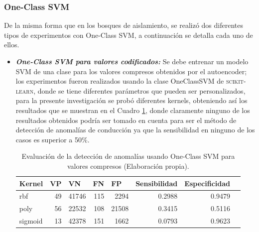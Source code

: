\subsubsection{One-Class SVM}

De la misma forma que en los bosques de aislamiento, se realiz\'{o} dos diferentes tipos de experimentos con One-Class SVM, a continuaci\'{o}n se detalla cada uno de ellos.

\begin{itemize}
\item \textbf{\textit{One-Class SVM para valores codificados: }}Se debe entrenar un modelo SVM de una clase para los valores compresos obtenidos por el autoencoder; los experimentos fueron realizados usando la clase OneClassSVM de \textsc{scikit-learn}, donde se tiene diferentes par\'{a}metros que pueden ser personalizados, para la presente investigaci\'{o}n se prob\'{o} diferentes kernels, obteniendo as\'{i} los resultados que se muestran en el Cuadro \ref{table:evaluacion_SVM_encoded}, donde claramente ninguno de los resultados obtenidos podr\'{i}a ser tomado en cuenta para ser el m\'{e}todo de detecci\'{o}n de anomal\'{i}as de conducci\'{o}n ya que la sensibilidad en ninguno de los casos es superior a 50\%.

\begin{table}[H]
\centering
\begin{center}
\begin{tabular}{|l|r|r|r|r|r|r|r|}
\hline
\textbf{Kernel} & \multicolumn{1}{l|}{\textbf{VP}} & \multicolumn{1}{l|}{\textbf{VN}}& \multicolumn{1}{l|}{\textbf{FN}}& \multicolumn{1}{l|}{\textbf{FP}} & \multicolumn{1}{l|}{\textbf{Sensibilidad}} & \multicolumn{1}{l|}{\textbf{Especificidad}} \\ \hline
rbf & \cellcolor[HTML]{AADD99} 49 & \cellcolor[HTML]{AADD99} 41746 & \cellcolor[HTML]{FFCE93} 115 & \cellcolor[HTML]{FFCE93} 2294 & 0.2988 & 0.9479 \\ \hline
poly & \cellcolor[HTML]{AADD99} 56 & \cellcolor[HTML]{AADD99} 22532 & \cellcolor[HTML]{FFCE93} 108 & \cellcolor[HTML]{FFCE93} 21508 & 0.3415 & 0.5116 \\ \hline
sigmoid & \cellcolor[HTML]{AADD99} 13 & \cellcolor[HTML]{AADD99} 42378 & \cellcolor[HTML]{FFCE93} 151 & \cellcolor[HTML]{FFCE93} 1662 & 0.0793 & 0.9623 \\ \hline
\end{tabular}
\end{center}
\caption{Evaluaci\'{o}n de la detecci\'{o}n de anomal\'{i}as usando One-Class SVM para valores compresos (Elaboraci\'{o}n propia).}
\label{table:evaluacion_SVM_encoded}
\end{table}


\end{itemize}

